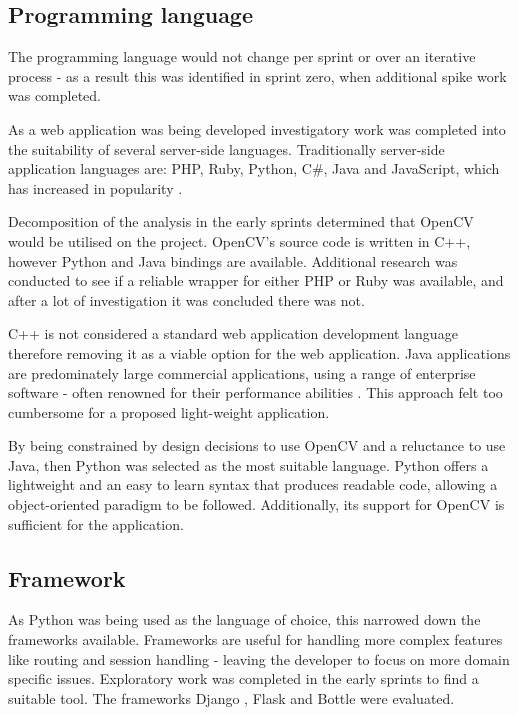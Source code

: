 \subsection{Programming language}
The programming language would not change per sprint or over an iterative process - as a result this was identified in sprint zero, when additional spike work was completed.

As a web application was being developed investigatory work was completed into the suitability of several server-side languages. Traditionally server-side application languages are: PHP, Ruby, Python, C\#, Java and JavaScript, which has increased in popularity \cite{citeulike:14018462}.

Decomposition of the analysis in the early sprints determined that OpenCV would be utilised on the project. OpenCV's source code is written in C++, however Python and Java bindings are available. Additional research was conducted to see if a reliable wrapper for either PHP or Ruby was available, and after a lot of investigation it was concluded there was not.

C++ is not considered a standard web application development language therefore removing it as a viable option for the web application. Java applications are predominately large commercial applications, using a range of enterprise software - often renowned for their performance abilities \cite{citeulike:14019744}. This approach felt too cumbersome for a proposed light-weight application.

By being constrained by design decisions to use OpenCV and a reluctance to use Java, then Python was selected as the most suitable language. Python offers a lightweight and an easy to learn syntax that produces readable code, allowing a object-oriented paradigm to be followed. Additionally, its support for OpenCV is sufficient for the application.

\subsection{Framework} \label{language:framework}
As Python was being used as the language of choice, this narrowed down the frameworks available. Frameworks are useful for handling more complex features like routing and session handling - leaving the developer to focus on more domain specific issues.   Exploratory work was completed in the early sprints to find a suitable tool. The frameworks Django \cite{citeulike:14019784}, Flask \cite{citeulike:13160396} and Bottle \cite{citeulike:14019792} were evaluated.

